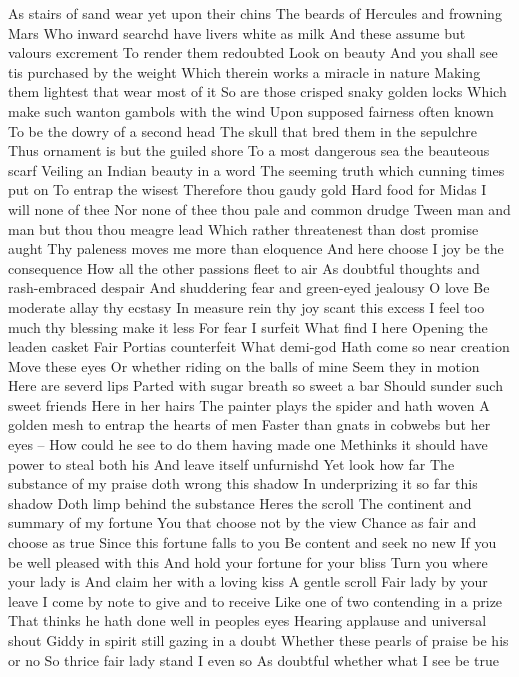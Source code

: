 As stairs of sand wear yet upon their chins
The beards of Hercules and frowning Mars
Who inward searchd have livers white as milk
And these assume but valours excrement
To render them redoubted Look on beauty
And you shall see tis purchased by the weight
Which therein works a miracle in nature
Making them lightest that wear most of it
So are those crisped snaky golden locks
Which make such wanton gambols with the wind
Upon supposed fairness often known
To be the dowry of a second head
The skull that bred them in the sepulchre
Thus ornament is but the guiled shore
To a most dangerous sea the beauteous scarf
Veiling an Indian beauty in a word
The seeming truth which cunning times put on
To entrap the wisest Therefore thou gaudy gold
Hard food for Midas I will none of thee
Nor none of thee thou pale and common drudge
Tween man and man but thou thou meagre lead
Which rather threatenest than dost promise aught
Thy paleness moves me more than eloquence
And here choose I joy be the consequence
How all the other passions fleet to air
As doubtful thoughts and rash-embraced despair
And shuddering fear and green-eyed jealousy O love
Be moderate allay thy ecstasy
In measure rein thy joy scant this excess
I feel too much thy blessing make it less
For fear I surfeit
What find I here
Opening the leaden casket
Fair Portias counterfeit What demi-god
Hath come so near creation Move these eyes
Or whether riding on the balls of mine
Seem they in motion Here are severd lips
Parted with sugar breath so sweet a bar
Should sunder such sweet friends Here in her hairs
The painter plays the spider and hath woven
A golden mesh to entrap the hearts of men
Faster than gnats in cobwebs but her eyes --
How could he see to do them having made one
Methinks it should have power to steal both his
And leave itself unfurnishd Yet look how far
The substance of my praise doth wrong this shadow
In underprizing it so far this shadow
Doth limp behind the substance Heres the scroll
The continent and summary of my fortune
You that choose not by the view
Chance as fair and choose as true
Since this fortune falls to you
Be content and seek no new
If you be well pleased with this
And hold your fortune for your bliss
Turn you where your lady is
And claim her with a loving kiss
A gentle scroll Fair lady by your leave
I come by note to give and to receive
Like one of two contending in a prize
That thinks he hath done well in peoples eyes
Hearing applause and universal shout
Giddy in spirit still gazing in a doubt
Whether these pearls of praise be his or no
So thrice fair lady stand I even so
As doubtful whether what I see be true
